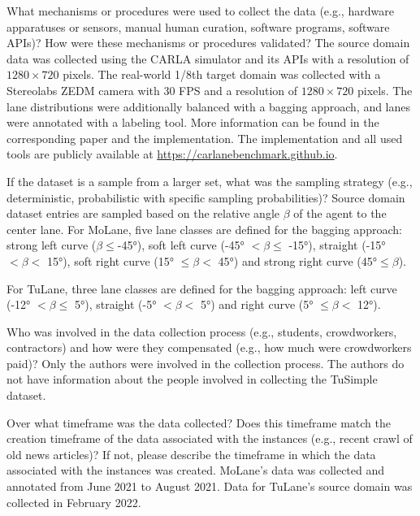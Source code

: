 \documentclass{article}
\begin{document}
	\begin{datasheetitem}{What mechanisms or procedures were used to collect the data (e.g., hardware apparatuses or sensors, manual human curation, software programs, software APIs)? \normalfont How were these mechanisms or procedures validated?}
		The source domain data was collected using the CARLA simulator and its APIs with a resolution of $1280\times720$ pixels. The real-world 1/8th target domain was collected with a Stereolabs ZEDM camera with 30 FPS and a resolution of $1280\times720$ pixels. The lane distributions were additionally balanced with a bagging approach, and lanes were annotated with a labeling tool. More information can be found in the corresponding paper and the implementation. The implementation and all used tools are publicly available at \url{https://carlanebenchmark.github.io}.
	\end{datasheetitem}
	\begin{datasheetitem}{If the dataset is a sample from a larger set, what was the sampling strategy (e.g., deterministic, probabilistic with specific sampling probabilities)?}
		Source domain dataset entries are sampled based on the relative angle $\beta$ of the agent to the center lane. For MoLane, five lane classes are defined for the bagging approach: strong left curve ($\beta\leq$\ang{-45}), soft left curve (\ang{-45} $ < \beta \leq $ \ang{-15}), straight (\ang{-15} $ < \beta <$ \ang{15}), soft right curve (\ang{15} $ \leq \beta < $ \ang{45}) and strong right curve (\ang{45}$\leq \beta$). 
		
		For TuLane, three lane classes are defined for the bagging approach: left curve (\ang{-12} $ < \beta \leq$ \ang{5}), straight (\ang{-5} $ < \beta <$ \ang{5}) and right curve (\ang{5} $ \leq \beta < $ \ang{12}). 
	\end{datasheetitem}
	\begin{datasheetitem}{Who was involved in the data collection process (e.g., students, crowdworkers, contractors) and how were they compensated (e.g., how much were crowdworkers paid)?}
		Only the authors were involved in the collection process. The authors do not have information about the people involved in collecting the TuSimple dataset.
	\end{datasheetitem}
	\begin{datasheetitem}{Over what timeframe was the data collected? \normalfont Does this timeframe match the creation timeframe of the data associated with the instances (e.g., recent crawl of old news articles)? If not, please describe the timeframe in which the data associated with the instances was created.}
		MoLane's data was collected and annotated from June 2021 to August 2021. Data for TuLane's source domain was collected in February 2022.
	\end{datasheetitem}
\end{document}
